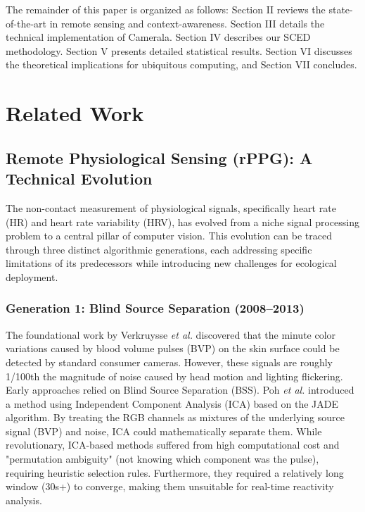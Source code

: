 \documentclass[journal]{IEEEtran}
\newcommand{\etal}{\textit{et al.}}
\begin{document}
The remainder of this paper is organized as follows: Section II reviews the state-of-the-art in remote sensing and context-awareness. Section III details the technical implementation of Camerala. Section IV describes our SCED methodology. Section V presents detailed statistical results. Section VI discusses the theoretical implications for ubiquitous computing, and Section VII concludes.

\section{Related Work}

\subsection{Remote Physiological Sensing (rPPG): A Technical Evolution}
The non-contact measurement of physiological signals, specifically heart rate (HR) and heart rate variability (HRV), has evolved from a niche signal processing problem to a central pillar of computer vision. This evolution can be traced through three distinct algorithmic generations, each addressing specific limitations of its predecessors while introducing new challenges for ecological deployment.

\subsubsection{Generation 1: Blind Source Separation (2008--2013)}
The foundational work by Verkruysse \etal \cite{verkruysse2008} discovered that the minute color variations caused by blood volume pulses (BVP) on the skin surface could be detected by standard consumer cameras. However, these signals are roughly 1/100th the magnitude of noise caused by head motion and lighting flickering.
Early approaches relied on Blind Source Separation (BSS). Poh \etal \cite{poh_ica} introduced a method using Independent Component Analysis (ICA) based on the JADE algorithm. By treating the RGB channels as mixtures of the underlying source signal (BVP) and noise, ICA could mathematically separate them. While revolutionary, ICA-based methods suffered from high computational cost and "permutation ambiguity" (not knowing which component was the pulse), requiring heuristic selection rules. Furthermore, they required a relatively long window (30s+) to converge, making them unsuitable for real-time reactivity analysis.
\end{document}
